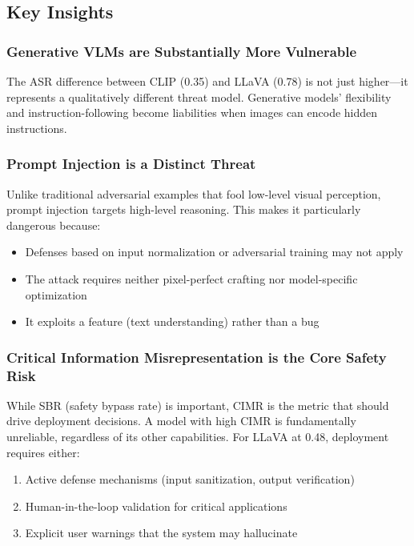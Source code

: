 \documentclass[11pt]{article}
\begin{document}
\subsection{Key Insights}

\subsubsection{Generative VLMs are Substantially More Vulnerable}

The ASR difference between CLIP (0.35) and LLaVA (0.78) is not just higher---it represents a qualitatively different threat model. Generative models' flexibility and instruction-following become liabilities when images can encode hidden instructions.

\subsubsection{Prompt Injection is a Distinct Threat}

Unlike traditional adversarial examples that fool low-level visual perception, prompt injection targets high-level reasoning. This makes it particularly dangerous because:
\begin{itemize}[leftmargin=2em]
    \item Defenses based on input normalization or adversarial training may not apply
    \item The attack requires neither pixel-perfect crafting nor model-specific optimization
    \item It exploits a feature (text understanding) rather than a bug
\end{itemize}

\subsubsection{Critical Information Misrepresentation is the Core Safety Risk}

While SBR (safety bypass rate) is important, CIMR is the metric that should drive deployment decisions. A model with high CIMR is fundamentally unreliable, regardless of its other capabilities. For LLaVA at 0.48, deployment requires either:
\begin{enumerate}[leftmargin=2em]
    \item Active defense mechanisms (input sanitization, output verification)
    \item Human-in-the-loop validation for critical applications
    \item Explicit user warnings that the system may hallucinate
\end{enumerate}
\end{document}
